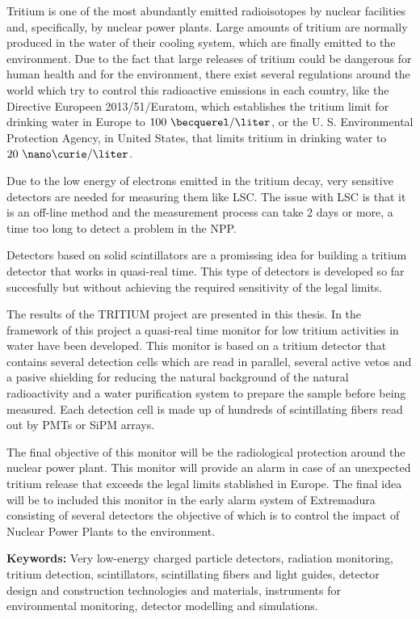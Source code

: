 Tritium is one of the most abundantly emitted radioisotopes by nuclear facilities and, specifically, by nuclear power plants. Large amounts of tritium are normally produced in the water of their cooling system, which are finally emitted to the environment. Due to the fact that large releases of tritium could be dangerous for human health and for the environment, there exist several regulations around the world which try to control this radioactive emissions in each country, like the Directive Europeen 2013/51/Euratom, which establishes the tritium limit for drinking water in Europe to $100~\becquerel/\liter$, or the U. S. Environmental Protection Agency, in United States, that limits tritium in drinking water to $20~\nano\curie/\liter$.

Due to the low energy of electrons emitted in the tritium decay, very sensitive detectors are needed for measuring them like LSC. The issue with LSC is that it is an off-line method and the measurement process can take 2 days or more, a time too long to detect a problem in the NPP.

Detectors based on solid scintillators are a promissing idea for building a tritium detector that works in quasi-real time. This type of detectors is developed so far succesfully but without achieving the required sensitivity of the legal limits.

The results of the TRITIUM project are presented in this thesis. In the framework of this project a quasi-real time monitor for low tritium activities in water have been developed. This monitor is based on a tritium detector that contains several detection cells which are read in parallel, several active vetos and a pasive shielding for reducing the natural background of the natural radioactivity and a water purification system to prepare the sample before being measured. Each detection cell is made up of hundreds of scintillating fibers read out by PMTs or SiPM arrays.

The final objective of this monitor will be the radiological protection around the nuclear power plant. This monitor will provide an alarm in case of an unexpected tritium release that exceeds the legal limits stablished in Europe. The final idea will be to included this monitor in the early alarm system of Extremadura consisting of several detectors the objective of which is to control the impact of Nuclear Power Plants to the environment.

\vspace{1cm}

\textbf{Keywords:} Very low-energy charged particle detectors, radiation monitoring, tritium detection, scintillators, scintillating fibers and light guides, detector design and construction technologies and materials, instruments for environmental monitoring, detector modelling and simulations.

